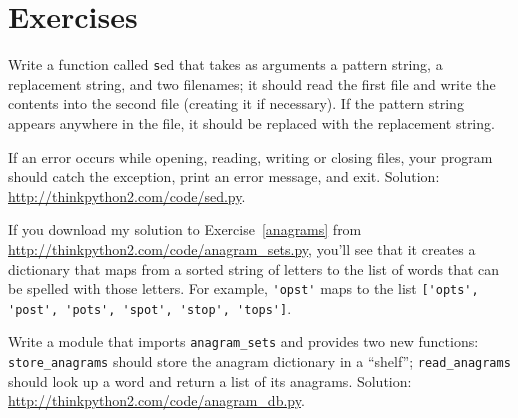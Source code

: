 \documentclass[
DIV=11,
fontsize=13,
twoside,
headinclude=false,
titlepage=firstiscover,
abstract=true,
headsepline=true,
footsepline=true,
chapterprefix=true, %
headings=big,
bibliography=totoc,%
captions=tableheading
]{scrbook}
\theoremstyle{definition}
\begin{document}
\section{Exercises}

\begin{exercise}
\normalfont

Write a function called {\texttt sed} that takes as arguments a pattern string,
a replacement string, and two filenames; it should read the first file
and write the contents into the second file (creating it if
necessary).  If the pattern string appears anywhere in the file, it
should be replaced with the replacement string.

If an error occurs while opening, reading, writing or closing files,
your program should catch the exception, print an error message, and
exit.  Solution: \url{http://thinkpython2.com/code/sed.py}.

\end{exercise}


\begin{exercise}
\normalfont
{}

If you download my solution to Exercise~\ref{anagrams} from
\url{http://thinkpython2.com/code/anagram_sets.py}, you'll see that it creates
a dictionary that maps from a sorted string of letters to the list of
words that can be spelled with those letters.  For example,
\verb"'opst'" maps to the list
\verb"['opts', 'post', 'pots', 'spot', 'stop', 'tops']".

Write a module that imports \verb"anagram_sets" and provides
two new functions: \verb"store_anagrams" should store the
anagram dictionary in a ``shelf''; \verb"read_anagrams" should
look up a word and return a list of its anagrams.
Solution: \url{http://thinkpython2.com/code/anagram_db.py}.

\end{exercise}
\end{document}
